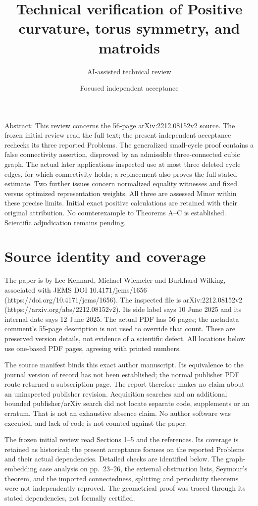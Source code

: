 \documentclass[10pt]{article}
\title{Technical verification of
Positive curvature, torus symmetry,
and matroids}
\author{AI-assisted technical review}
\date{Focused independent acceptance}
\begin{document}
\maketitle
Abstract: This review concerns the 56-page arXiv:2212.08152v2 source. The frozen initial review read the full text; the present independent acceptance rechecks its three reported Problems. The generalized small-cycle proof contains a false connectivity assertion, disproved by an admissible three-connected cubic graph. The actual later applications inspected use at most three deleted cycle edges, for which connectivity holds; a replacement also proves the full stated estimate. Two further issues concern normalized equality witnesses and fixed versus optimized representation weights. All three are assessed Minor within these precise limits. Initial exact positive calculations are retained with their original attribution. No counterexample to Theorems A–C is established. Scientific adjudication remains pending.\par
\section*{Source identity and coverage}
The paper is by Lee Kennard, Michael Wiemeler and Burkhard Wilking, associated with JEMS DOI 10.4171/jems/1656 (https://doi.org/10.4171/jems/1656). The inspected file is arXiv:2212.08152v2 (https://arxiv.org/abs/2212.08152v2). Its side label says 10 June 2025 and its internal date says 12 June 2025. The actual PDF has 56 pages; the metadata comment’s 55-page description is not used to override that count. These are preserved version details, not evidence of a scientific defect. All locations below use one-based PDF pages, agreeing with printed numbers.\par
The source manifest binds this exact author manuscript. Its equivalence to the journal version of record has not been established; the normal publisher PDF route returned a subscription page. The report therefore makes no claim about an uninspected publisher revision. Acquisition searches and an additional bounded publisher/arXiv search did not locate separate code, supplements or an erratum. That is not an exhaustive absence claim. No author software was executed, and lack of code is not counted against the paper.\par
The frozen initial review read Sections 1–5 and the references. Its coverage is retained as historical; the present acceptance focuses on the reported Problems and their actual dependencies. Detailed checks are identified below. The graph-embedding case analysis on pp. 23–26, the external obstruction lists, Seymour’s theorem, and the imported connectedness, splitting and periodicity theorems were not independently reproved. The geometrical proof was traced through its stated dependencies, not formally certified.\par
\end{document}
